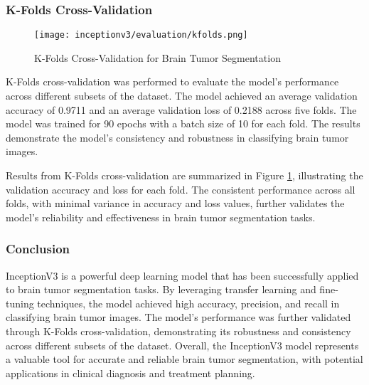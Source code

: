 \subsubsection{K-Folds Cross-Validation}

\begin{figure}[H]
  \begin{center}
    \texttt{[image: inceptionv3/evaluation/kfolds.png]}
  \end{center}
  \caption{K-Folds Cross-Validation for Brain Tumor Segmentation}\label{f:inceptionv3_kfolds}
\end{figure}

K-Folds cross-validation was performed to evaluate the model's performance across different subsets of the dataset. The model achieved an average validation accuracy of 0.9711 and an average validation loss of 0.2188 across five folds. The model was trained for 90 epochs with a batch size of 10 for each fold. The results demonstrate the model's consistency and robustness in classifying brain tumor images.

Results from K-Folds cross-validation are summarized in Figure \ref{f:inceptionv3_kfolds}, illustrating the validation accuracy and loss for each fold. The consistent performance across all folds, with minimal variance in accuracy and loss values, further validates the model's reliability and effectiveness in brain tumor segmentation tasks.



\subsubsection{Conclusion}

InceptionV3 is a powerful deep learning model that has been successfully applied to brain tumor segmentation tasks. By leveraging transfer learning and fine-tuning techniques, the model achieved high accuracy, precision, and recall in classifying brain tumor images. The model's performance was further validated through K-Folds cross-validation, demonstrating its robustness and consistency across different subsets of the dataset. Overall, the InceptionV3 model represents a valuable tool for accurate and reliable brain tumor segmentation, with potential applications in clinical diagnosis and treatment planning.
